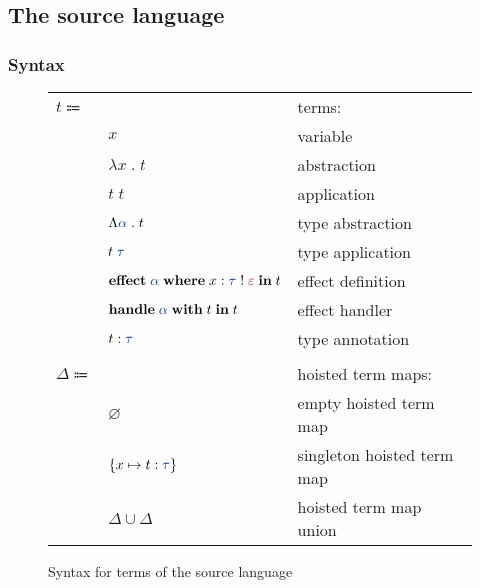 \documentclass[12pt]{article}
\newcommand\anno[2]{#1 : #2}
\newcommand\term{t}
\newcommand\eVar{x}
\newcommand\eAbs[2]{\lambda #1 \; . \; #2}
\newcommand\eApp[2]{#1 \; #2}
\newcommand\eTAbs[2]{\Lambda \colorType{#1} \; . \; #2}
\newcommand\eTApp[2]{#1 \; \colorType{#2}}
\newcommand\eHandle[3]{\textbf{handle} \; \colorType{#1} \; \textbf{with} \; #2 \; \textbf{in} \; #3}
\newcommand\eEffect[5]{\textbf{effect} \; \colorType{#1} \; \textbf{where} \; \anno{#2}{\tEmbellished{#3}{#4}} \; \textbf{in} \; #5}
\newcommand\eAnno[2]{\anno{#1}{\colorType{#2}}}
\newcommand\colorType[1]{\textcolor[RGB]{12, 56, 150}{#1}}
\newcommand\type{\tau}
\newcommand\tVar{\alpha}
\newcommand\tEmbellished[2]{\colorType{#1} \; ! \; \colorRow{#2}}
\newcommand\colorRow[1]{\textcolor[RGB]{150, 26, 12}{#1}}
\newcommand\row{\varepsilon}
\newcommand\hoistedTerms{\Delta}
\newcommand\hSingleton[3]{\left\{ #1 \mapsto \anno{#2}{\colorType{#3}} \right\}}
\newcommand\hEmpty{\varnothing}
\newcommand\hUnion[2]{#1 \cup #2}
\begin{document}
    \subsection{The source language}

      \subsubsection{Syntax}

        \begin{figure}[H]
          \begin{mdframed}[backgroundcolor=none]
            \begin{center}
              \begin{tabular}{l l l}
                $\term \Coloneqq$ & & terms: \\
                & $\eVar$ & variable \\
                & $\eAbs{\eVar}{\term}$ & abstraction \\
                & $\eApp{\term}{\term}$ & application \\
                & $\eTAbs{\tVar}{\term}$ & type abstraction \\
                & $\eTApp{\term}{\type}$ & type application \\
                & $\eEffect{\tVar}{\eVar}{\type}{\row}{\term}$ & effect definition \\
                & $\eHandle{\tVar}{\term}{\term}$ & effect handler \\
                & $\eAnno{\term}{\type}$ & type annotation \\
                \\
                $\hoistedTerms \Coloneqq$ & & hoisted term maps: \\
                & $\hEmpty$ & empty hoisted term map \\
                & $\hSingleton{\eVar}{\term}{\type}$ & singleton hoisted term map \\
                & $\hUnion{\hoistedTerms}{\hoistedTerms}$ & hoisted term map union \\
              \end{tabular}
            \end{center}

            \caption{Syntax for terms of the source language}\label{fig:source_syntax}
          \end{mdframed}
        \end{figure}
\end{document}
